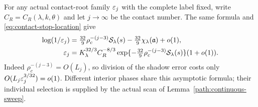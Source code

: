For any actual contact-root family $\varepsilon_j$ with the complete label
fixed, write $C_R=C_R(\lambda,k,\theta)$ and let
$j\to\infty$ be the contact number. The same formula and
\eqref{eq:contact-stop-location} give
\begin{align}
 \log(1/\varepsilon_j)
 &=\tfrac{32}{9}\rho_c^{-(j-3)}\mathcal S_\lambda(s)
       -\tfrac{32}{9}\chi_\lambda(\mathfrak a)+o(1),\nonumber\\
 \varepsilon_j
 &=K_\lambda^{32/3}C_R^{-8/3}
 \exp\{-\tfrac{32}{9}\rho_c^{-(j-3)}\mathcal S_\lambda(s)\}
 (1+o(1)).
 \label{sel:contact-roots}
\end{align}
Indeed $\rho_c^{-(j-3)}=O(L_j)$, so division of the shadow error
costs only $O(L_j\varepsilon_j^{3/32})=o(1)$.
Different interior phases share this asymptotic formula; their
individual selection is supplied by the actual scan of
Lemma~\ref{path:continuous-sweep}.


